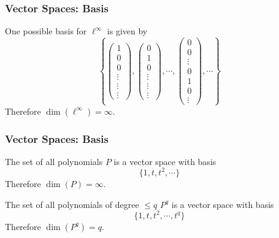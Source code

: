 \documentclass{beamer}
\begin{document}
\begin{frame}\frametitle{Vector Spaces: Basis}

\begin{example}
One possible basis for $\boldsymbol{\ell}^\infty$ is given by
\[
\left\{
  \left(
    \begin{array}{c}
      1\\
      0\\
      0\\
      \vdots\\
      \vdots\\
      \vdots
    \end{array}
  \right)
  ,\left(
    \begin{array}{c}
      0\\
      1\\
      0\\
      \vdots\\
      \vdots\\
      \vdots
    \end{array}
  \right)
  ,\cdots,
  \left(
    \begin{array}{c}
      0\\
      0\\
      \vdots\\
      0\\
      1\\
      0\\
      \vdots
    \end{array}
  \right)
  ,\cdots
\right\}
\]
Therefore $\dim(\boldsymbol{\ell}^\infty) = \infty$.
\end{example}
\end{frame}

\begin{frame}\frametitle{Vector Spaces: Basis}
\begin{example}
The set of all polynomials $P$ is a vector space with basis
\[ \{1,t,t^2,\cdots\} \]
Therefore $\dim(P) = \infty$.
\end{example}

\begin{example}
The set of all polynomials of degree $\leq q$ $P^q$ is a vector space with basis
\[ \{1,t,t^2,\cdots, t^q\} \]
Therefore $\dim(P^q) = q$.
\end{example}
\end{frame}

\end{document}
